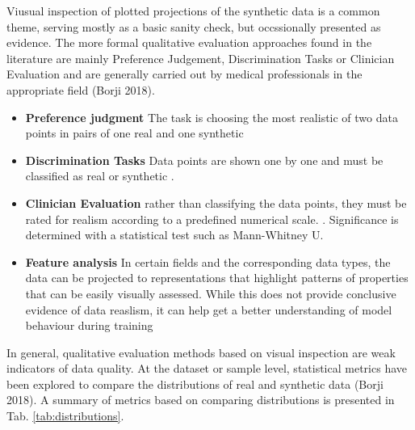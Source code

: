         Viusual inspection of plotted projections of the synthetic data is a common theme, serving mostly as a basic sanity check, but occssionally presented as evidence. The more formal qualitative evaluation approaches found in the literature are mainly Preference Judgement, Discrimination Tasks or Clinician Evaluation and are generally carried out by medical professionals in the appropriate field (Borji 2018).
            \begin{itemize}
                \item \textbf{Preference judgment} The task is choosing the most realistic of two data points in pairs of one real and one synthetic \cite{Choi2017-nt}
                \item \textbf{Discrimination Tasks} Data points are shown one by one and must be classified as real or synthetic \cite{Beaulieu-Jones2019-ct}.
                \item \textbf{Clinician Evaluation} rather than classifying the data points, they must be rated for realism according to a predefined numerical scale. \cite{Beaulieu-Jones2019-ct}. Significance is determined with a statistical test such as Mann-Whitney U.
                \item \textbf{Feature analysis} In certain fields and the corresponding data types, the data can be projected to representations that highlight patterns of properties that can be easily visually assessed. While this does not provide conclusive evidence of data reaslism, it can help get a better understanding of model behaviour during training 
            \end{itemize}

        In general, qualitative evaluation methods based on visual inspection are weak indicators of data quality. At the dataset or sample level, statistical metrics have been explored to compare the distributions of real and synthetic data (Borji 2018). A summary of metrics based on comparing distributions is presented in Tab. \ref{tab:distributions}.
        
